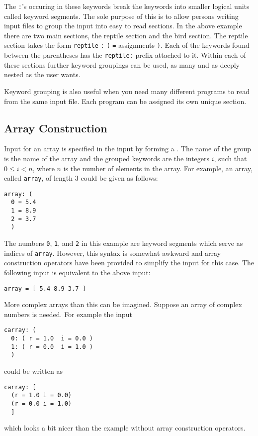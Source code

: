 The \verb|:|'s occuring in these keywords break the keywords into
smaller logical units called keyword segments.  The sole purpose of this
is to allow persons writing input files to group the input into easy to
read sections.  In the above example there are two main sections, the
reptile section and the bird section.  The reptile section takes the
form \verb|reptile| \verb|:| \verb|(|  \verb|=| 
assignments \verb|)|.  Each of the keywords found between the
parentheses has the \verb|reptile:| prefix attached to it.  Within each
of these sections further keyword groupings can be used, as many and as
deeply nested as the user wants.

Keyword grouping is also useful when you need many different programs to
read from the same input file.  Each program can be assigned its own
unique section.

\subsection{Array Construction}
\label{pkvarray}

Input for an array is specified in the input by forming a .  The name of the group is the name of the array and the
grouped keywords are the integers $i$, such that $0 \leq i < n$, where $n$
is the number of elements in the array.  For example, an array, called
\verb|array|, of length 3 could be given as follows:
\begin{verbatim}
array: (
  0 = 5.4
  1 = 8.9
  2 = 3.7
  )
\end{verbatim}
The numbers \verb|0|, \verb|1|, and \verb|2| in this example are keyword
segments which serve as indices of \verb|array|.  However, this syntax
is somewhat awkward and array construction operators have been provided
to simplify the input for this case.  The following input is equivalent
to the above input:
\begin{verbatim}
array = [ 5.4 8.9 3.7 ]
\end{verbatim}

More complex arrays than this can be imagined.  Suppose an array of
complex numbers is needed.  For example the input
\begin{verbatim}
carray: (
  0: ( r = 1.0  i = 0.0 )
  1: ( r = 0.0  i = 1.0 )
  )
\end{verbatim}
could be written as
\begin{verbatim}
carray: [
  (r = 1.0 i = 0.0)
  (r = 0.0 i = 1.0)
  ]
\end{verbatim}
which looks a bit nicer than the example without array construction
operators.

